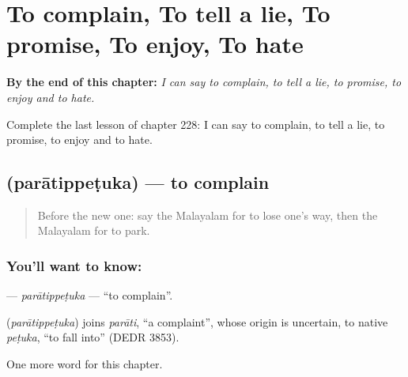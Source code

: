 
\chapter{To complain, To tell a lie, To promise, To enjoy, To hate}
\label{ch:ml-to-complain-to-tell-a-lie-to-promise-to-enjoy-to-hate}

\begin{chapteropening}
\textbf{By the end of this chapter:} \emph{I can say to complain, to tell a lie, to promise, to enjoy and to hate.}

Complete the last lesson of chapter 228: I can say to complain, to tell a lie, to promise, to enjoy and to hate.
\end{chapteropening}

\section[\texorpdfstring{\ml{പരാതിപ്പെടുക} (parātippeṭuka)}{പരാതിപ്പെടുക (parātippeṭuka)}]{ (parātippeṭuka) — to complain}

\label{lesson:ML-C228-paratippetuka}



\begin{quote}
Before the new one: say the Malayalam for to lose one's way, then the Malayalam for to park.
\end{quote}

\subsection*{You'll want to know: }
\textbf{} — \emph{parātippeṭuka} — \textquotedblleft{}to complain\textquotedblright{}.

\begin{cousinweb}
\textbf{} (\emph{parātippeṭuka}) joins \emph{parāti}, \textquotedblleft{}a complaint\textquotedblright{}, whose origin is uncertain, to native \emph{peṭuka}, \textquotedblleft{}to fall into\textquotedblright{} (DEDR 3853).
\end{cousinweb}

\begin{grammarlens}[title={What you've built}]
One more word for this chapter.
\end{grammarlens}

